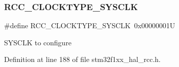 \subsubsection{\texorpdfstring{R\+C\+C\+\_\+\+C\+L\+O\+C\+K\+T\+Y\+P\+E\+\_\+\+S\+Y\+S\+C\+LK}{RCC\_CLOCKTYPE\_SYSCLK}}
{\footnotesize\ttfamily \#define R\+C\+C\+\_\+\+C\+L\+O\+C\+K\+T\+Y\+P\+E\+\_\+\+S\+Y\+S\+C\+LK~0x00000001U}

S\+Y\+S\+C\+LK to configure 

Definition at line 188 of file stm32f1xx\+\_\+hal\+\_\+rcc.\+h.

